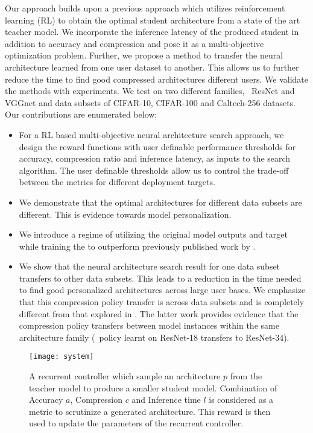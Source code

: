\documentclass[../main]{subfiles}
\begin{document}
    Our approach builds upon a previous approach \cite{ashok2017n2n} which utilizes reinforcement learning (RL) to obtain the optimal student architecture from a state of the art teacher model.
    We incorporate the inference latency of the produced student in addition to accuracy and compression and pose it as a multi-objective optimization problem.
    Further, we propose a method to transfer the neural architecture learned from one user dataset to another.
    This allows us to further reduce the time to find good compressed architectures \wrt{} different users.
    We validate the methods with experiments.
    We test on two different families, \viz~ResNet and VGGnet and \wrt{} data subsets of CIFAR-10, CIFAR-100 and Caltech-256 datasets.
    Our contributions are enumerated below:
    \begin{itemize}
        \item For a RL based multi-objective neural architecture search approach, we design the reward functions with user definable performance thresholds for accuracy, compression ratio and inference latency, as inputs to the search algorithm.
        The user definable thresholds allow us to control the trade-off between the metrics for different deployment targets.
        \item We demonstrate that the optimal architectures for different data subsets are different.
        This is evidence towards model personalization.
        \item We introduce a regime of utilizing the original model outputs and target while training the  to outperform previously published work by \cite{ashok2017n2n,hinton2015distilling}.
        \item We show that the neural architecture search result for one data subset transfers to other data subsets.
        This leads to a reduction in the time needed to find good personalized architectures across large user bases.
        We emphasize that this compression policy transfer is across data subsets and is completely different from that explored in \cite{ashok2017n2n}.
        The latter work provides evidence that the compression policy transfers between model instances within the same architecture family (\eg~policy learnt on ResNet-18 transfers to ResNet-34).
    \end{itemize}
    
    \begin{figure}
      \texttt{[image: system]}
      \caption{A recurrent controller which sample an architecture $p$ from the teacher model to produce a smaller student model.
      Combination of Accuracy $a$, Compression $c$ and Inference time $l$ is considered as a metric to scrutinize a generated architecture.
      This reward is then used to update the parameters of the recurrent controller.}
      \label{fig:boat1}
    \end{figure}
\end{document}
